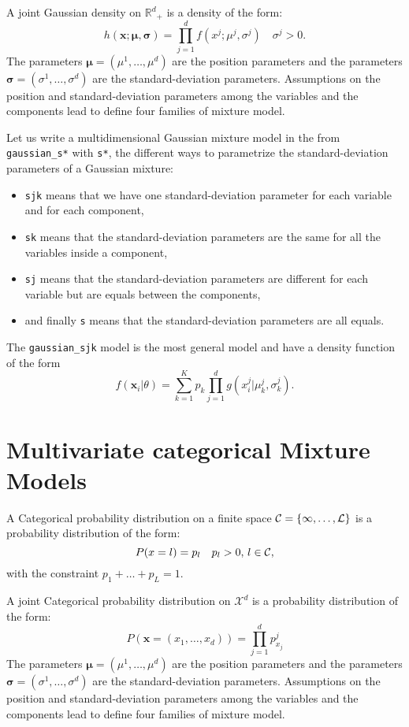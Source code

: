 \documentclass[a4paper,10pt]{article}
\newcommand{\Rd}{{\mathbb{R}^d}}
\newcommand{\Xd}{{\mathcal{X}^d}}
\newcommand{\bx}{\mathbf{x}}
\newcommand{\bsigma}{\boldsymbol{\sigma}}
\newcommand{\bmu}{\boldsymbol{\mu}}
\begin{document}
A joint Gaussian density on $\Rd_+$ is a density of the form:
\begin{equation}\label{law::joint-gaussian-density}
h(\bx;\bmu,\bsigma) = \prod_{j=1}^d f(x^j;\mu^j,\sigma^j) \quad \sigma^j>0.
\end{equation}
The parameters $\bmu=(\mu^1,\ldots,\mu^d)$ are the position parameters and the parameters $\bsigma=(\sigma^1,\ldots,\sigma^d)$
are the standard-deviation parameters. Assumptions on the position and standard-deviation parameters among the variables and the components
lead to define four families of mixture model.

Let us write a multidimensional Gaussian mixture model in the from \verb+gaussian_s*+
with \verb+s*+, the different ways to parametrize the standard-deviation parameters of a Gaussian mixture:
\begin{itemize}
\item \verb+sjk+ means that we have one standard-deviation parameter for each variable and for each component,
\item \verb+sk+ means that the standard-deviation parameters are the same for all the variables inside a component,
\item \verb+sj+ means that the standard-deviation parameters are different for each variable but are equals between the components,
\item and finally \verb+s+ means that the standard-deviation parameters are all equals.
\end{itemize}

The \verb+gaussian_sjk+ model is the most general model and have a density function of the form
\begin{equation}\label{eq:f_sjk}
  f({\bx}_i|\theta) = \sum_{k=1}^K p_k \prod_{j=1}^d g(x^j_{i}| \mu^j_{k}, \sigma^j_{k}).
\end{equation}


\section{Multivariate categorical Mixture Models}

A Categorical probability distribution on a finite space $\cal C = \{1,\ldots,L\}$ is a probability distribution of the form:
\begin{equation}\label{law::categorical}
P(x=l) = p_l \quad p_l>0,\, l\in \cal C,
\end{equation}
with the constraint $p_1+\ldots+p_L = 1.$

A joint Categorical probability distribution on $\Xd$ is a probability distribution of the form:
\begin{equation}\label{law::joint-gaussian-density}
P(\bx=(x_1,\ldots,x_d)) = \prod_{j=1}^d p^j_{x_j}
\end{equation}
The parameters $\bmu=(\mu^1,\ldots,\mu^d)$ are the position parameters and the parameters $\bsigma=(\sigma^1,\ldots,\sigma^d)$
are the standard-deviation parameters. Assumptions on the position and standard-deviation parameters among the variables and the components
lead to define four families of mixture model.
\end{document}
